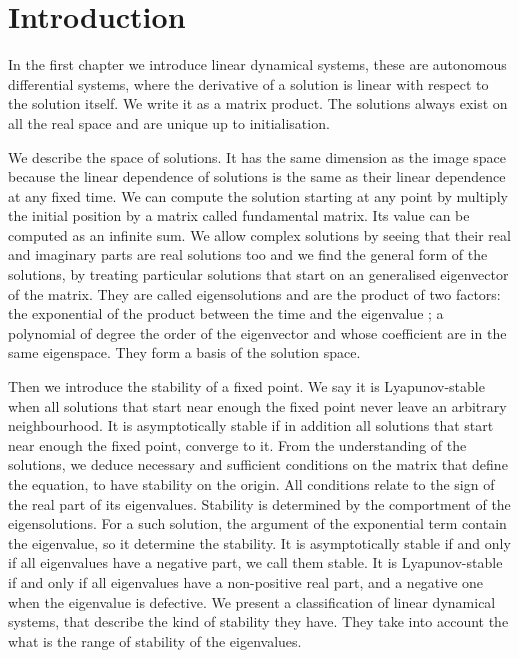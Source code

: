 \section{Introduction}
In the first chapter we introduce linear dynamical systems, these are autonomous differential systems, where the derivative of a solution is linear with respect to the solution itself. We write it as a matrix product. The solutions always exist on all the real space and are unique up to initialisation.

We describe the space of solutions. It has the same dimension as the image space because the linear dependence of solutions is the same as their linear dependence at any fixed time. We can compute the solution starting at any point by multiply the initial position by a matrix called fundamental matrix. Its value can be computed as an infinite sum. We allow complex solutions by seeing that their real and imaginary parts are real solutions too and we find the general form of the solutions, by treating particular solutions that start on an generalised eigenvector of the matrix. They are called eigensolutions and are the product of two factors: the exponential of the product between the time and the eigenvalue ; a polynomial of degree the order of the eigenvector and whose coefficient are in the same eigenspace. They form a basis of the solution space.

Then we introduce the stability of a fixed point. We say it is Lyapunov-stable when all solutions that start near enough the fixed point never leave an arbitrary neighbourhood. It is asymptotically stable if in addition all solutions that start near enough the fixed point, converge to it. From the understanding of the solutions, we deduce necessary and sufficient conditions on the matrix that define the equation, to have stability on the origin. All conditions relate to the sign of the real part of its eigenvalues. Stability is determined by the comportment of the eigensolutions. For a such solution, the argument of the exponential term contain the eigenvalue, so it determine the stability. It is asymptotically stable if and only if all eigenvalues have a negative part, we call them stable. It is Lyapunov-stable if and only if all eigenvalues have a non-positive real part, and a negative one when the eigenvalue is defective. We present a classification of linear dynamical systems, that describe the kind of stability they have. They take into account the what is the range of stability of the eigenvalues.

